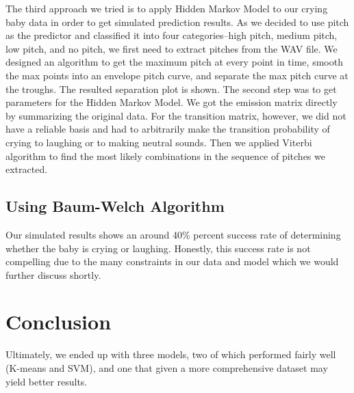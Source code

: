 \documentclass[paper=a4, fontsize=11pt]{scrartcl}
\numberwithin{equation}{section}
\numberwithin{figure}{section}
\numberwithin{table}{section}
\begin{document}
The third approach we tried is to apply Hidden Markov Model to our crying baby data in order to get simulated prediction results. As we decided to use pitch as the predictor and classified it into four categories--high pitch, medium pitch, low pitch, and no pitch, we first need to extract pitches from the WAV file. We designed an algorithm to get the maximum pitch at every point in time, smooth the max points into an envelope pitch curve, and separate the max pitch curve at the troughs. The resulted separation plot is shown. The second step was to get parameters for the Hidden Markov Model. We got the emission matrix directly by summarizing the original data. For the transition matrix, however, we did not have a reliable basis and had to arbitrarily make the transition probability of crying to laughing or to making neutral sounds. Then we applied Viterbi algorithm to find the most likely combinations in the sequence of pitches we extracted.

\subsection{Using Baum-Welch Algorithm}

Our simulated results shows an around 40\% percent success rate of determining whether the baby is crying or laughing. Honestly, this success rate is not compelling due to the many constraints in our data and model which we would further discuss shortly.

\section{Conclusion}
Ultimately, we ended up with three models, two of which performed fairly well (K-means and SVM), and one that given a more comprehensive dataset may yield better results.
\end{document}
